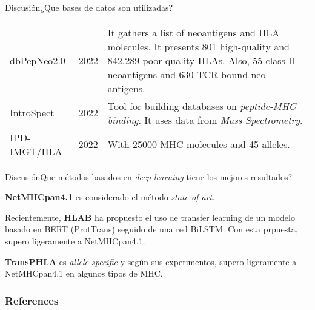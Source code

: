 \documentclass[10pt]{beamer}
\newcommand{\1}{
	\setbeamertemplate{background}{
		\texttt{[image: img/1]}
		\tikz[overlay] \fill[fill opacity=0.75,fill=white] (0,0) rectangle (-\paperwidth,\paperheight);
	}
}
\begin{document}
\begin{frame}{Discusión}{¿Que bases de datos son utilizadas?}
\begin{table}[]
{\begin{tabular}{p{1.7cm}p{1.2cm}p{6.5cm}}
				\\
				dbPepNeo2.0    & 2022 \cite{lu2022dbpepneo2}                                          &
				It gathers a list of neoantigens and HLA molecules. It presents 801 high-quality and 842,289 poor-quality HLAs. Also, 55 class II neoantigens and 630 TCR-bound neo antigens.
				\\
				IntroSpect      & 2022 \cite{zhang2022introspect}                                      & Tool for building databases on \textit{peptide-MHC binding}. It uses data from \textit{Mass Spectrometry}.   \\
				
				IPD-IMGT/HLA & 2022 \cite{robinson2020ipd}    &    With 25000 MHC molecules and 45 alleles.                                                                
			\end{tabular}
		}
	\end{table}	
\end{frame}


\begin{frame}{Discusión}{Que métodos basados en \textit{deep learning} tiene los mejores resultados?}
	\begin{block}{ }
		
		\textbf{NetMHCpan4.1} es considerado el método \textit{state-of-art}. 
	\end{block}	

	\begin{block}{ }
		
		Recientemente, \textbf{HLAB} \cite{zhang2022hlab} ha propuesto el uso de transfer learning  de un modelo basado en BERT (ProtTrans) seguido de una red BiLSTM. Con esta prpuesta, supero ligeramente a NetMHCpan4.1.
	\end{block}	

	\begin{block}{}
		\textbf{TransPHLA} \cite{chu2022transformer} es \textit{allele-specific} y según sus experimentos, supero ligeramente a NetMHCpan4.1 en algunos tipos de MHC.
	\end{block}
\end{frame}



\begin{frame}
	\frametitle{References}
	
	
\end{frame}
\end{document}
